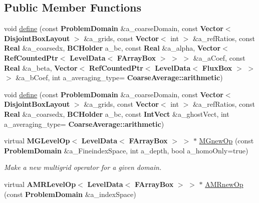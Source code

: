 \subsection*{Public Member Functions}
\begin{DoxyCompactItemize}
\item 
void \hyperlink{class_a_m_r_projection_op_factory_a826d78ce1993a87c0a5e69268494ae12}{define} (const \textbf{ Problem\+Domain} \&a\+\_\+coarse\+Domain, const \textbf{ Vector}$<$ \textbf{ Disjoint\+Box\+Layout} $>$ \&a\+\_\+grids, const \textbf{ Vector}$<$ int $>$ \&a\+\_\+ref\+Ratios, const \textbf{ Real} \&a\+\_\+coarsedx, \textbf{ B\+C\+Holder} a\+\_\+bc, const \textbf{ Real} \&a\+\_\+alpha, \textbf{ Vector}$<$ \textbf{ Ref\+Counted\+Ptr}$<$ \textbf{ Level\+Data}$<$ \textbf{ F\+Array\+Box} $>$ $>$ $>$ \&a\+\_\+a\+Coef, const \textbf{ Real} \&a\+\_\+beta, \textbf{ Vector}$<$ \textbf{ Ref\+Counted\+Ptr}$<$ \textbf{ Level\+Data}$<$ \textbf{ Flux\+Box} $>$ $>$ $>$ \&a\+\_\+b\+Coef, int a\+\_\+averaging\+\_\+type=\textbf{ Coarse\+Average\+::arithmetic})
\item 
void \hyperlink{class_a_m_r_projection_op_factory_afb2b5b8c9667efa30cf9b90b6c0f455b}{define} (const \textbf{ Problem\+Domain} \&a\+\_\+coarse\+Domain, const \textbf{ Vector}$<$ \textbf{ Disjoint\+Box\+Layout} $>$ \&a\+\_\+grids, const \textbf{ Vector}$<$ int $>$ \&a\+\_\+ref\+Ratios, const \textbf{ Real} \&a\+\_\+coarsedx, \textbf{ B\+C\+Holder} a\+\_\+bc, const \textbf{ Int\+Vect} \&a\+\_\+ghost\+Vect, int a\+\_\+averaging\+\_\+type=\textbf{ Coarse\+Average\+::arithmetic})
\item 
\mbox{\label{class_a_m_r_projection_op_factory_a4b2ce37d6d05f13f96f45357eb5a99ac}} 
virtual \textbf{ M\+G\+Level\+Op}$<$ \textbf{ Level\+Data}$<$ \textbf{ F\+Array\+Box} $>$ $>$ $\ast$ \hyperlink{class_a_m_r_projection_op_factory_a4b2ce37d6d05f13f96f45357eb5a99ac}{M\+Gnew\+Op} (const \textbf{ Problem\+Domain} \&a\+\_\+\+Fineindex\+Space, int a\+\_\+depth, bool a\+\_\+homo\+Only=true)
\begin{DoxyCompactList}\small\item\em Make a new multigrid operator for a given domain. \end{DoxyCompactList}\item 
\mbox{\label{class_a_m_r_projection_op_factory_a2662bc309724ed6ddc5372af5eda4247}} 
virtual \textbf{ A\+M\+R\+Level\+Op}$<$ \textbf{ Level\+Data}$<$ \textbf{ F\+Array\+Box} $>$ $>$ $\ast$ \hyperlink{class_a_m_r_projection_op_factory_a2662bc309724ed6ddc5372af5eda4247}{A\+M\+Rnew\+Op} (const \textbf{ Problem\+Domain} \&a\+\_\+index\+Space)

\end{DoxyCompactItemize}
